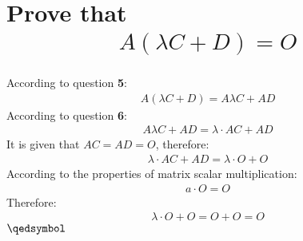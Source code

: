 \documentclass[a4paper, 12pt]{article}
\newcommand{\eq}[1]{\begin{align*}#1\end{align*}}
\renewcommand{\qed}{\hfill\(\qedsymbol\)}
\begin{document}
\section{Prove that \eq{A(\lambda{C}+D)=O}}
According to question \textbf{5}:
\eq{
    A(\lambda{C}+D)=A\lambda{C}+AD
}
According to question \textbf{6}:
\eq{
    A\lambda{C}+AD=\lambda\cdot{AC}+AD
}
It is given that $AC=AD=O$, therefore:
\eq{
    \lambda\cdot{AC}+AD=\lambda\cdot{O}+O
}
According to the properties of matrix scalar multiplication:
\eq{
    a\cdot{O}=O
}
Therefore:
\eq{
    \lambda\cdot{O}+O=O+O=O
}
\qed

\setcounter{section}{9}
\section{}

\end{document}
